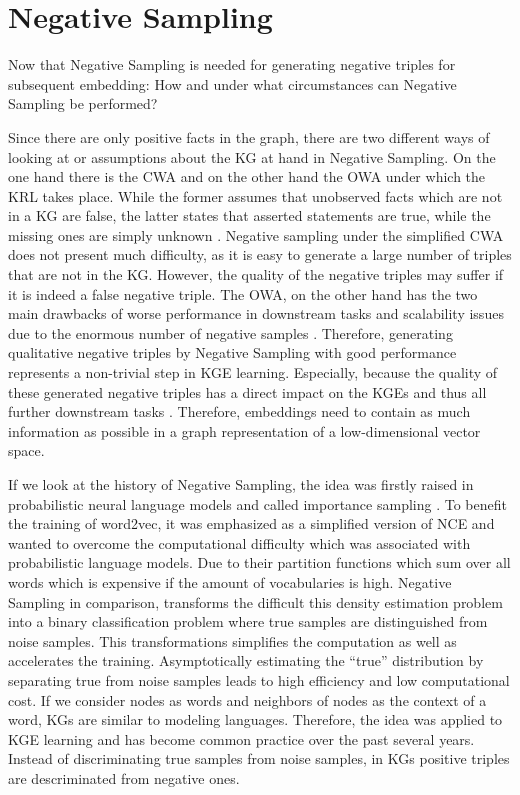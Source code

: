 \section{Negative Sampling}
\label{sec:negative_sampling}

Now that Negative Sampling is needed for generating negative triples for subsequent embedding:
How and under what circumstances can Negative Sampling be performed?

Since there are only positive facts in the graph, there are two different ways of looking at or assumptions about the \ac{KG} at hand in Negative Sampling.
On the one hand there is the \ac{CWA} and on the other hand the \ac{OWA} under which the \ac{KRL} takes place.
While the former assumes that unobserved facts which are not in a \ac{KG} are false, the latter states that asserted statements are true, while the missing ones are simply unknown \cite{arnaout2020enriching, qiannegative}.
Negative sampling under the simplified \ac{CWA} does not present much difficulty, as it is easy to generate a large number of triples that are not in the \ac{KG}.
However, the quality of the negative triples may suffer if it is indeed a false negative triple.
The \ac{OWA}, on the other hand has the two main drawbacks of worse performance in downstream tasks and scalability issues due to the enormous number of negative samples \cite{qiannegative}.
Therefore, generating qualitative negative triples by Negative Sampling with good performance represents a non-trivial step in \ac{KGE} learning.
Especially, because the quality of these generated negative triples has a direct impact on the \acp{KGE} and thus all further downstream tasks \cite{qiannegative}.
Therefore, embeddings need to contain as much information as possible in a graph representation of a low-dimensional vector space.

If we look at the history of Negative Sampling, the idea was firstly raised in probabilistic neural language models and called importance sampling \cite{qianunderstanding}. 
To benefit the training of word2vec, it was emphasized as a simplified version of \ac{NCE} and wanted to overcome the computational difficulty which was associated with probabilistic language models.
Due to their partition functions which sum over all words which is expensive if the amount of vocabularies is high.
Negative Sampling in comparison, transforms the difficult this density estimation problem into a binary classification problem where true samples are distinguished from noise samples.
This transformations simplifies the computation as well as accelerates the training.
Asymptotically estimating the “true” distribution by separating true from noise samples leads to high efficiency and low computational cost.
If we consider nodes as words and neighbors of nodes as the context of a word, \acp{KG} are similar to modeling languages.
Therefore, the idea was applied to \ac{KGE} learning and has become common practice over the past several years.
Instead of discriminating true samples from noise samples, in \acp{KG} positive triples are descriminated from negative ones.

